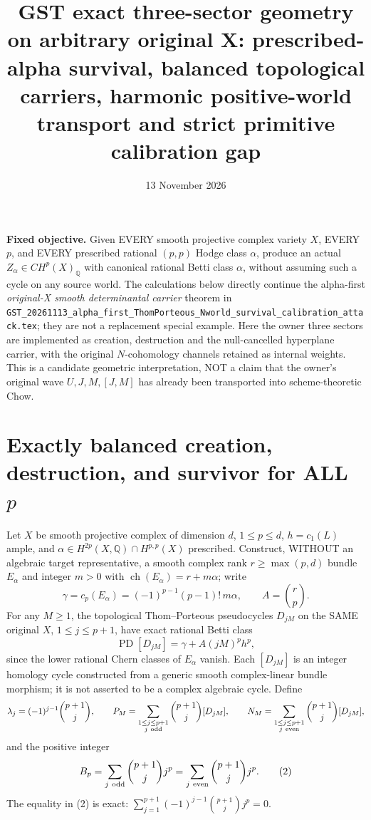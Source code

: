 \documentclass[11pt]{article}
\title{GST exact three-sector geometry on arbitrary original X: prescribed-alpha survival, balanced topological carriers, harmonic positive-world transport and strict primitive calibration gap}
\date{13 November 2026}
\newcommand{\Q}{\mathbb Q}
\begin{document}
\maketitle

\noindent\textbf{Fixed objective.}
Given EVERY smooth projective complex variety \(X\), EVERY \(p\), and EVERY prescribed rational \((p,p)\) Hodge class \(\alpha\), produce an actual \(Z_\alpha\in CH^p(X)_\Q\) with canonical rational Betti class \(\alpha\), without assuming such a cycle on any source world. The calculations below directly continue the alpha-first \emph{original-X smooth determinantal carrier} theorem in \texttt{GST\_20261113\_alpha\_first\_ThomPorteous\_Nworld\_survival\_calibration\_attack.tex}; they are not a replacement special example. Here the owner three sectors are implemented as creation, destruction and the null-cancelled hyperplane carrier, with the original \(N\)-cohomology channels retained as internal weights. This is a candidate geometric interpretation, NOT a claim that the owner's original wave \(U,J,M,[J,M]\) has already been transported into scheme-theoretic Chow.

\section{Exactly balanced creation, destruction, and survivor for ALL \(p\)}
Let \(X\) be smooth projective complex of dimension \(d\), \(1\le p\le d\), \(h=c_1(L)\) ample, and \(\alpha\in H^{2p}(X,\Q)\cap H^{p,p}(X)\) prescribed. Construct, WITHOUT an algebraic target representative, a smooth complex rank \(r\ge\max(p,d)\) bundle \(E_\alpha\) and integer \(m>0\) with \(\operatorname{ch}(E_\alpha)=r+m\alpha\); write
\[
\gamma=c_p(E_\alpha)=(-1)^{p-1}(p-1)!\,m\alpha,\qquad
A=\binom rp.
\]
For any \(M\ge1\), the topological Thom--Porteous pseudocycles \(D_{jM}\) on the SAME original \(X\), \(1\le j\le p+1\), have exact rational Betti class
\[
\operatorname{PD}[D_{jM}]=\gamma + A(jM)^ph^p,                    \tag{1}
\]
since the lower rational Chern classes of \(E_\alpha\) vanish. Each \([D_{jM}]\) is an integer homology cycle constructed from a generic smooth complex-linear bundle morphism; it is not asserted to be a complex algebraic cycle. Define
\[
\lambda_j=(-1)^{j-1}\binom{p+1}{j},\qquad
P_M=\sum_{\substack{1\le j\le p+1\\j\ {\rm odd}}}\binom{p+1}{j}[D_{jM}],\qquad
N_M=\sum_{\substack{1\le j\le p+1\\j\ {\rm even}}}\binom{p+1}{j}[D_{jM}],
\]
and the positive integer
\[
B_p=\sum_{j\ {\rm odd}}\binom{p+1}{j}j^p
=\sum_{j\ {\rm even}}\binom{p+1}{j}j^p.                         \tag{2}
\]
The equality in (2) is exact: \(\sum_{j=1}^{p+1}(-1)^{j-1}\binom{p+1}{j}j^p=0\).
\end{document}
